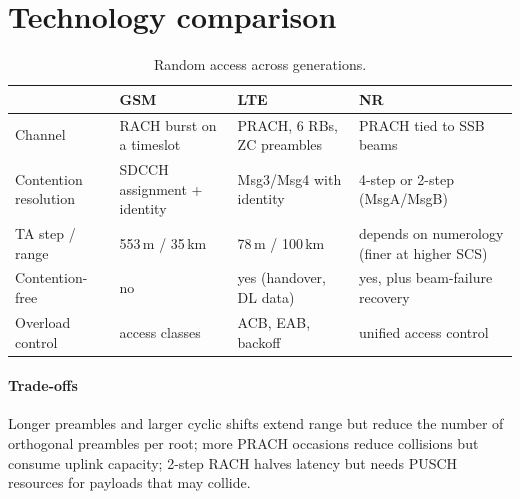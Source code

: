 \documentclass[11pt,a4paper]{article}
\begin{document}
\section{Technology comparison}
\begin{table}[htbp]
\centering\small
\caption{Random access across generations.}\label{tab:compare}
\begin{tabularx}{\linewidth}{@{}l Y Y Y@{}}
\toprule
{} & GSM & LTE & NR \\
\midrule
Channel           & RACH burst on a timeslot           & PRACH, 6 RBs, ZC preambles        & PRACH tied to SSB beams \\
Contention resolution & SDCCH assignment + identity    & Msg3/Msg4 with identity           & 4-step or 2-step (MsgA/MsgB) \\
TA step / range   & 553\,m / 35\,km                    & 78\,m / 100\,km                   & depends on numerology (finer at higher SCS) \\
Contention-free   & no                                 & yes (handover, DL data)           & yes, plus beam-failure recovery \\
Overload control  & access classes                     & ACB, EAB, backoff                 & unified access control \\
\bottomrule
\end{tabularx}
\end{table}

\paragraph{Trade-offs} Longer preambles and larger cyclic shifts extend range but reduce the number of
orthogonal preambles per root; more PRACH occasions reduce collisions but consume uplink capacity; 2-step
RACH halves latency but needs PUSCH resources for payloads that may collide.

\end{document}

